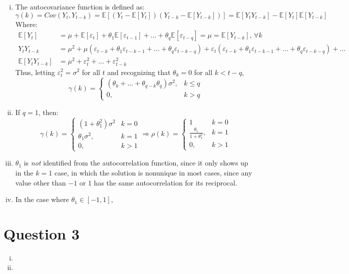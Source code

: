 \documentclass{article}
\newcommand{\E}[1]{\mathbb{E}\left[#1\right]}%
\begin{document}
\begin{enumerate}[(i)]
	\item The autocovariance function is defined as:
		\[
			\gamma(k) = Cov(Y_t,Y_{t-k}) = \E{\left(Y_t - \E{Y_t}\right)\left(Y_{t-k} - \E{Y_{t-k}}\right)} = \E{Y_tY_{t-k}} - \E{Y_{t}}\E{Y_{t-k}}
		\]
		Where:
		\begin{align*}
			\E{Y_t} 	&= \mu + \E{\varepsilon_t} + \theta_1\E{\varepsilon_{t-1}} + ... + \theta_q\E{\varepsilon_{t-q}} = \mu = \E{Y_{t-k}}\text{, }\forall k	\\
			Y_tY_{t-k}	&= \mu^2 + \mu\left(\varepsilon_{t-k}+ \theta_1\varepsilon_{t-k-1}+ ... + \theta_q\varepsilon_{t-k-q}\right) 
							+ \varepsilon_t\left(\varepsilon_{t-k}+ \theta_1\varepsilon_{t-k-1}+ ... + \theta_q\varepsilon_{t-k-q}\right) + ...							\\
		\E{Y_tY_{t-k}}	&= \mu^2 + \varepsilon_t^2 + ... + \varepsilon_{t-k}^2			
		\end{align*}
		Thus, letting ${\varepsilon_t^2 = \sigma^2}$ for all $t$ and recognizing that ${\theta_k=0}$ for all ${k<t-q}$,
		\[
			\gamma(k) = \begin{cases} 
							\left(\theta_k + ... + \theta_{q-k}\theta_q\right)\sigma^2, 	& k\leq q \\ 
							0, 																& k>q 
						\end{cases}
		\]
	
	\item If ${q=1}$, then:
		\[
			\gamma(k) =  \begin{cases} 
							\left(1 + \theta_1^2\right)\sigma^2	& k = 0	\\
							\theta_1\sigma^2, 					& k = 1 \\ 
							0, 									& k>1
						\end{cases} \Rightarrow 
			\rho(k) =  \begin{cases} 
							1									& k = 0	\\
							\frac{\theta_1}{1 + \theta_1^2}, 	& k = 1 \\ 
							0, 									& k>1
						\end{cases}
		\]
	
	\item $\theta_1$ is \textit{not} identified from the autocorrelation function, since it only shows up in the $k=1$ case, in which the solution is nonunique in most cases, since any value other than $-1$ or $1$ has the same autocorrelation for its reciprocal.
	
	
	\item In the case where $\theta_1\in[-1,1]$, 
	
\end{enumerate}


\section*{Question 3}

\begin{enumerate}[(i)]
	\item 
	
	
	\item 

	
\end{enumerate}



\end{document}
